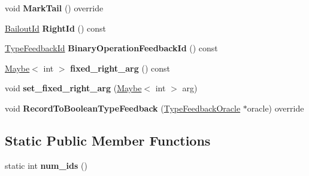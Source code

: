 \begin{DoxyCompactItemize}
\item 
void {\bfseries Mark\+Tail} () override\hypertarget{classv8_1_1internal_1_1_binary_operation_a3d0a03a8485f8cf102b8239ced7f3b5b}{}\label{classv8_1_1internal_1_1_binary_operation_a3d0a03a8485f8cf102b8239ced7f3b5b}

\item 
\hyperlink{classv8_1_1internal_1_1_bailout_id}{Bailout\+Id} {\bfseries Right\+Id} () const \hypertarget{classv8_1_1internal_1_1_binary_operation_a103d7b604e0162e119643619391f772e}{}\label{classv8_1_1internal_1_1_binary_operation_a103d7b604e0162e119643619391f772e}

\item 
\hyperlink{classv8_1_1internal_1_1_type_feedback_id}{Type\+Feedback\+Id} {\bfseries Binary\+Operation\+Feedback\+Id} () const \hypertarget{classv8_1_1internal_1_1_binary_operation_a4fa18ae99eaea28cdf69f617373accc2}{}\label{classv8_1_1internal_1_1_binary_operation_a4fa18ae99eaea28cdf69f617373accc2}

\item 
\hyperlink{classv8_1_1_maybe}{Maybe}$<$ int $>$ {\bfseries fixed\+\_\+right\+\_\+arg} () const \hypertarget{classv8_1_1internal_1_1_binary_operation_a7abe6178ad8d91adaf2866ece4f1308e}{}\label{classv8_1_1internal_1_1_binary_operation_a7abe6178ad8d91adaf2866ece4f1308e}

\item 
void {\bfseries set\+\_\+fixed\+\_\+right\+\_\+arg} (\hyperlink{classv8_1_1_maybe}{Maybe}$<$ int $>$ arg)\hypertarget{classv8_1_1internal_1_1_binary_operation_ae1adaf776f584f6170ccfb96321d234e}{}\label{classv8_1_1internal_1_1_binary_operation_ae1adaf776f584f6170ccfb96321d234e}

\item 
void {\bfseries Record\+To\+Boolean\+Type\+Feedback} (\hyperlink{classv8_1_1internal_1_1_type_feedback_oracle}{Type\+Feedback\+Oracle} $\ast$oracle) override\hypertarget{classv8_1_1internal_1_1_binary_operation_a03a01f5dccd95f9f75b7975ccad23653}{}\label{classv8_1_1internal_1_1_binary_operation_a03a01f5dccd95f9f75b7975ccad23653}

\end{DoxyCompactItemize}
\subsection*{Static Public Member Functions}
\begin{DoxyCompactItemize}
\item 
static int {\bfseries num\+\_\+ids} ()\hypertarget{classv8_1_1internal_1_1_binary_operation_af953a471ea1545ed4a502de89436d59c}{}\label{classv8_1_1internal_1_1_binary_operation_af953a471ea1545ed4a502de89436d59c}

\end{DoxyCompactItemize}
